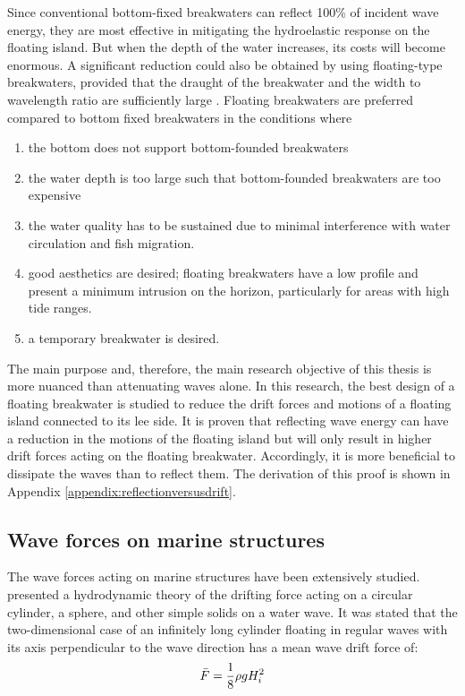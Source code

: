 Since conventional bottom-fixed breakwaters can reflect 100\% of incident wave energy, they are most effective in mitigating the hydroelastic response on the floating island. But when the depth of the water increases, its costs will become enormous. A significant reduction could also be obtained by using floating-type breakwaters, provided that the draught of the breakwater and the width to wavelength ratio are sufficiently large \parencite{Wang2010}. Floating breakwaters are preferred compared to bottom fixed breakwaters in the conditions where
\begin{enumerate}
    \item the bottom does not support bottom-founded breakwaters
    \item the water depth is too large such that bottom-founded breakwaters are too expensive
    \item the water quality has to be sustained due to minimal interference with water circulation and fish migration.
    \item good aesthetics are desired; floating breakwaters have a low profile and present a minimum intrusion on the horizon, particularly for areas with high tide ranges.
    \item a temporary breakwater is desired. 
\end{enumerate}


The main purpose and, therefore, the main research objective of this thesis is more nuanced than attenuating waves alone. In this research, the best design of a floating breakwater is studied to reduce the drift forces and motions of a floating island connected to its lee side. It is proven that reflecting wave energy can have a reduction in the motions of the floating island but will only result in higher drift forces acting on the floating breakwater. Accordingly, it is more beneficial to dissipate the waves than to reflect them. The derivation of this proof is shown in Appendix \ref{appendix:reflectionversusdrift}.
\\


\subsection{Wave forces on marine structures}
The wave forces acting on marine structures have been extensively studied. \parencite{Maruo1960} presented a hydrodynamic theory of the drifting force acting on a circular cylinder, a sphere, and other simple solids on a water wave. It was stated that the two-dimensional case of an infinitely long cylinder floating in regular waves with its axis perpendicular to the wave direction has a mean wave drift force of:
\begin{equation}
    \Bar{F} = \frac{1}{8}\rho g H_i^2
\end{equation}

